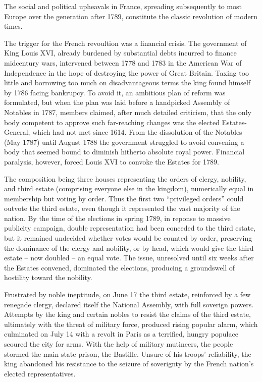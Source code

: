 \documentclass[
  openany]{book}
\begin{document}
The social and political upheavals in France, spreading subsequently to most Europe over the generation after 1789, constitute the classic revolution of modern times.

The trigger for the French revoultion was a financial crisis. The government of King Louis XVI, already burdened by substantial debts incurred to finance midcentury wars, intervened between 1778 and 1783 in the American War of Independence in the hope of destroying the power of Great Britain. Taxing too little and borrowing too much on disadvantageous terms the king found himself by 1786 facing bankrupcy. To avoid it, an ambitious plan of reform was formulated, but when the plan was laid before a handpicked Assembly of Notables in 1787, members claimed, after much detailed criticism, that the only body competent to approve such far-reaching changes was the elected Estates-General, which had not met since 1614. From the dissolution of the Notables (May 1787) until August 1788 the government struggled to avoid convening a body that seemed bound to diminish hitherto absolute royal power. Financial paralysis, however, forced Louis XVI to convoke the Estates for 1789.

The composition being three houses representing the orders of clergy, nobility, and third estate (comprising everyone else in the kingdom), numerically equal in membership but voting by order. Thus the first two ``privileged orders'' could outvote the third estate, even though it represented the vast majority of the nation. By the time of the elections in spring 1789, in reponse to massive publicity campaign, double representation had been conceded to the third estate, but it remained undecided whether votes would be counted by order, preserving the dominance of the clergy and nobility, or by head, which would give the third estate -- now doubled -- an equal vote. The issue, unresolved until six weeks after the Estates convened, dominated the elections, producing a groundswell of hostility toward the nobility.

Frustrated by noble ineptitude, on June 17 the third estate, reinforced by a few renegade clergy, declared itself the National Assembly, with full soverign powers. Attempts by the king and certain nobles to resist the claims of the third estate, ultimately with the threat of military force, produced rising popular alarm, which culminated on July 14 with a revolt in Paris as a terrified, hungry populace scoured the city for arms. With the help of military mutineers, the people stormed the main state prison, the Bastille. Unsure of his troops' reliability, the king abandoned his resistance to the seizure of soverignty by the French nation's elected representatives.
\end{document}
